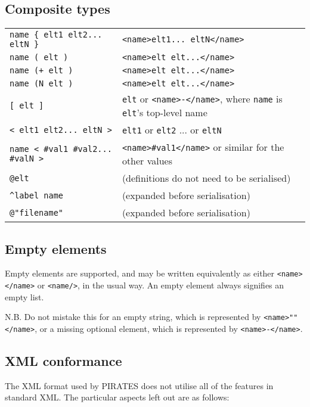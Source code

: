 \documentclass[12pt,a4paper,twoside]{article}
\renewcommand{\_}{\texttt{\symbol{95}}}
\begin{document}
\subsection{Composite types}

\begin{tabular}{l|l}
\verb^name { elt1 elt2... eltN }^ & \verb^<name>elt1... eltN</name>^\\
\verb^name ( elt )^ & \verb^<name>elt elt...</name>^\\
\verb^name (+ elt )^ & \verb^<name>elt elt...</name>^\\
\verb^name (N elt )^ & \verb^<name>elt elt...</name>^\\
\verb^[ elt ]^ & \verb^elt^ or \verb^<name>-</name>^, where \verb^name^ is
	\verb^elt^'s top-level name\\
\verb^< elt1 elt2... eltN >^ & \verb^elt1^ or \verb^elt2^ ... or \verb^eltN^\\
\verb^name < #val1 #val2... #valN >^ &
	\verb^<name>#val1</name>^ or similar for the other values\\
\verb^@elt^ & (definitions do not need to be serialised)\\
\verb~^label name~ & (expanded before serialisation)\\
\verb~@"filename"~ & (expanded before serialisation)\\
\end{tabular}

\subsection{Empty elements}

Empty elements are supported, and may be written equivalently as either
\verb^<name></name>^ or \verb^<name/>^, in the usual way.
An empty element always signifies an empty list.

N.B. Do not mistake this for an empty string, which is represented by
\verb^<name>""</name>^, or a missing optional element, which is represented
by \verb^<name>-</name>^.

\subsection{XML conformance}

The XML format used by PIRATES does not utilise all of the features in
standard XML. The particular aspects left out are as follows:
\end{document}
